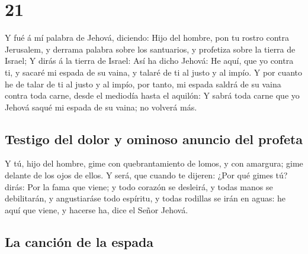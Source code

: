 \hypertarget{section-20}{%
\section{21}\label{section-20}}

 Y fué á mí palabra de Jehová, diciendo: 
Hijo del hombre, pon tu rostro contra Jerusalem, y derrama palabra sobre
los santuarios, y profetiza sobre la tierra de Israel;  Y
dirás á la tierra de Israel: Así ha dicho Jehová: He aquí, que yo contra
ti, y sacaré mi espada de su vaina, y talaré de ti al justo y al impío.
 Y por cuanto he de talar de ti al justo y al impío, por
tanto, mi espada saldrá de su vaina contra toda carne, desde el mediodía
hasta el aquilón:  Y sabrá toda carne que yo Jehová saqué
mi espada de su vaina; no volverá más.

\hypertarget{testigo-del-dolor-y-ominoso-anuncio-del-profeta}{%
\subsection{Testigo del dolor y ominoso anuncio del
profeta}\label{testigo-del-dolor-y-ominoso-anuncio-del-profeta}}

 Y tú, hijo del hombre, gime con quebrantamiento de lomos,
y con amargura; gime delante de los ojos de ellos.  Y
será, que cuando te dijeren: ¿Por qué gimes tú? dirás: Por la fama que
viene; y todo corazón se desleirá, y todas manos se debilitarán, y
angustiaráse todo espíritu, y todas rodillas se irán en aguas: he aquí
que viene, y hacerse ha, dice el Señor Jehová.

\hypertarget{la-canciuxf3n-de-la-espada}{%
\subsection{La canción de la espada}\label{la-canciuxf3n-de-la-espada}}

